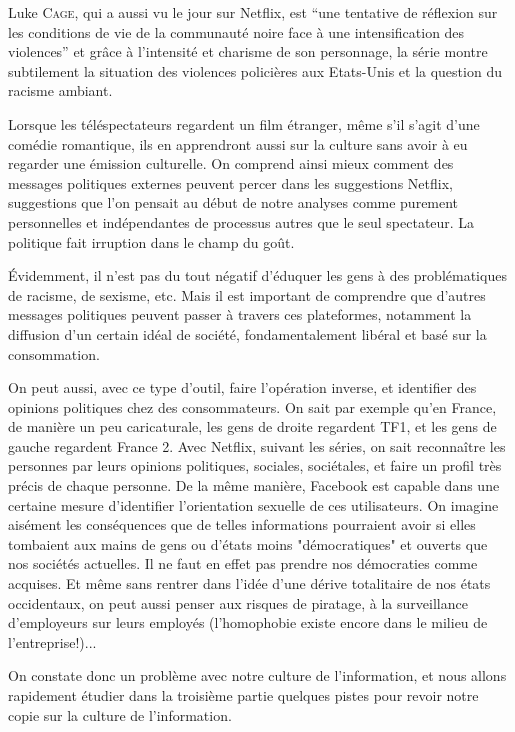 \documentclass[a4paper,14pt]{extreport}
\begin{document}
Luke \textsc{Cage}, qui a aussi vu le jour sur Netflix, est “une tentative de réflexion sur les conditions de vie de la communauté noire face à une intensification des violences” et grâce à l’intensité et charisme de son personnage, la série montre subtilement la situation des violences policières aux Etats-Unis et la question du racisme ambiant.

Lorsque les téléspectateurs regardent un film étranger, même s'il s'agit d'une comédie romantique, ils en apprendront aussi sur la culture sans avoir à eu regarder une émission culturelle. On comprend ainsi mieux comment des messages politiques externes peuvent percer dans les suggestions Netflix, suggestions que l'on pensait au début de notre analyses comme purement personnelles et indépendantes de processus autres que le seul spectateur. La politique fait irruption dans le champ du goût.

Évidemment, il n'est pas du tout négatif d'éduquer les gens à des problématiques de racisme, de sexisme, etc. Mais il est important de comprendre que d'autres messages politiques peuvent passer à travers ces plateformes, notamment la diffusion d'un certain idéal de société, fondamentalement libéral et basé sur la consommation.

On peut aussi, avec ce type d'outil, faire l'opération inverse, et identifier des opinions politiques chez des consommateurs. On sait par exemple qu'en France, de manière un peu caricaturale, les gens de droite regardent TF1, et les gens de gauche regardent France 2. Avec Netflix, suivant les séries, on sait reconnaître les personnes par leurs opinions politiques, sociales, sociétales, et faire un profil très précis de chaque personne. De la même manière, Facebook est capable dans une certaine mesure d'identifier l'orientation sexuelle de ces utilisateurs. On imagine aisément les conséquences que de telles informations pourraient avoir si elles tombaient aux mains de gens ou d'états moins "démocratiques" et ouverts que nos sociétés actuelles. Il ne faut en effet pas prendre nos démocraties comme acquises. Et même sans rentrer dans l'idée d'une dérive totalitaire de nos états occidentaux, on peut aussi penser aux risques de piratage, à la surveillance d'employeurs sur leurs employés (l'homophobie existe encore dans le milieu de l'entreprise!)... 

On constate donc un problème avec notre culture de l'information, et nous allons rapidement étudier dans la troisième partie quelques pistes pour revoir notre copie sur la culture de l'information.
\end{document}
